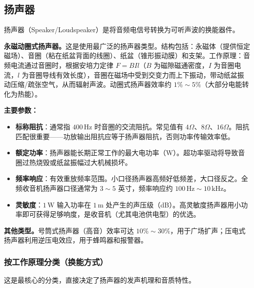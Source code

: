 \documentclass[12pt,UTF8]{ctexbook}
\begin{document}
\subsection{扬声器}

扬声器（Speaker/Loudspeaker）是将音频电信号转换为可听声波的换能器件。

\textbf{永磁动圈式扬声器。}这是使用最广泛的扬声器类型。结构包括：永磁体（提供恒定磁场）、音圈（粘在纸盆背面的线圈）、纸盆（锥形振动膜）和支架。工作原理：音频电流通过音圈时，根据安培力定律 $F = BIl$（$B$ 为磁隙磁通密度，$I$ 为音圈电流，$l$ 为音圈导线有效长度），音圈在磁场中受到交变力而上下振动，带动纸盆振动压缩/疏张空气，从而辐射声波。动圈式扬声器效率约 $1\%\sim5\%$（大部分电能转化为热能）。

\textbf{主要参数：}
\begin{itemize}
	\item \textbf{标称阻抗}：通常指 $400\,\mathrm{Hz}$ 时音圈的交流阻抗。常见值有 $4\Omega$、$8\Omega$、$16\Omega$。阻抗匹配很重要——功放输出阻抗应等于扬声器阻抗，否则功率传输效率低。
	\item \textbf{额定功率}：扬声器能长期正常工作的最大电功率（W）。超功率驱动将导致音圈过热烧毁或纸盆振幅过大机械损坏。
	\item \textbf{频率响应}：有效重放频率范围。小口径扬声器高频好低频差，大口径反之。全频收音机扬声器口径通常为 $3\sim5$ 英寸，频率响应约 $100\,\mathrm{Hz}\sim10\,\mathrm{kHz}$。
	\item \textbf{灵敏度}：$1\,\mathrm{W}$ 输入功率在 $1\,\mathrm{m}$ 处产生的声压级（dB）。高灵敏度扬声器用小功率即可获得足够响度，是收音机（尤其电池供电型）的优选。
\end{itemize}

\textbf{其他类型。}号筒式扬声器（高音）效率可达 $10\%\sim30\%$，用于广场扩声；压电式扬声器利用逆压电效应，用于蜂鸣器和报警器。
	
\subsubsection{按工作原理分类（换能方式）}

这是最核心的分类，直接决定了扬声器的发声机理和音质特性。
	
\end{document}
